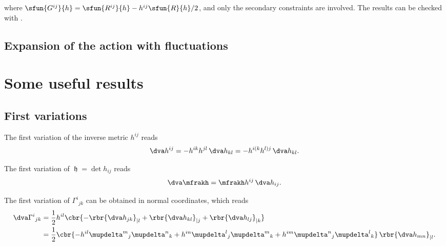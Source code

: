 \documentclass[a4paper,11pt]{article}
\begin{document}
where $\sfun{G^{ij}}{h} = \sfun{R^{ij}}{h} - h^{ij}\sfun{R}{h}/2$, and only the 
secondary constraints are involved. The results can be checked with 
\cite[4.2.7]{Poisson2004}.

\subsection{Expansion of the action with fluctuations}

\appendix

\section*{Some useful results}

\subsection*{First variations}

The first variation of the inverse metric $h^{ij}$ reads
\begin{align}
\dva h^{ij} = -h^{ik}h^{jl}\,\dva h_{kl} = - h^{i(k}h^{l)j}\,\dva h_{kl}.
\end{align}

The first variation of $\mfrakh = \det h_{ij}$ reads
\begin{align}
\dva \mfrakh = \mfrakh h^{ij}\,\dva h_{ij}.
\end{align}

The first variation of $\Gamma^i{}_{jk}$ can be obtained in normal coordinates,
which reads
\begin{align}
\dva \Gamma^{i}{}_{jk} &= \frac{1}{2} h^{il}
\cbr{-\rbr{\dva h_{jk}}_{|l} + \rbr{\dva h_{kl}}_{|j} + \rbr{\dva h_{lj}}_{|k}}
\\
&= \frac{1}{2} \cbr{-h^{il}\mupdelta^m{}_j\mupdelta^n{}_k
+h^{in}\mupdelta^l{}_j\mupdelta^m{}_k
+h^{im}\mupdelta^n{}_j\mupdelta^l{}_k}\,\rbr{\dva h_{mn}}_{|l}.
\end{align}
\end{document}
